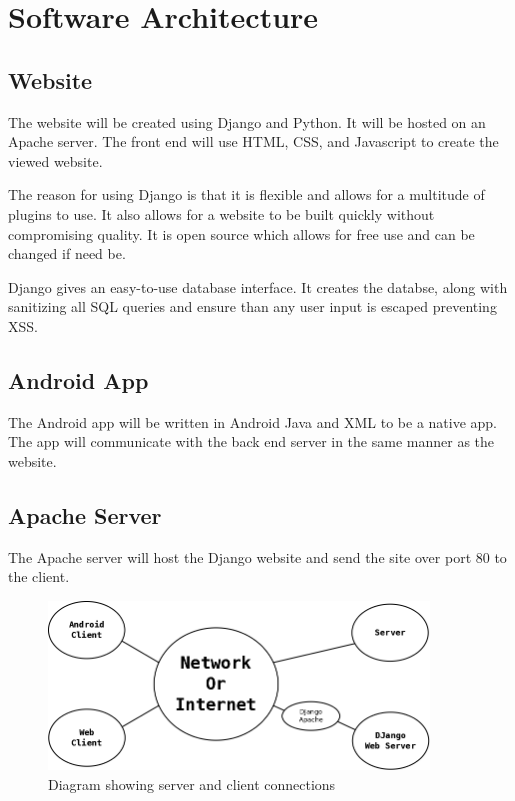 {
    \renewcommand*{\theenumi}{\thesubsection.\arabic{enumi}}
    \renewcommand*{\theenumii}{\theenumi.\arabic{enumii}}
    \renewcommand*{\theenumiii}{\theenumii.\arabic{enumiii}}

    \section{Software Architecture}

    \subsection{Website}

        The website will be created using Django and Python. It will be hosted 
        on an Apache server. The front end will use HTML, CSS, and Javascript
        to create the viewed website.

        The reason for using Django is that it is flexible and allows for 
        a multitude of plugins to use. It also allows for a website to be built
        quickly without compromising quality. It is open source which allows
        for free use and can be changed if need be.

        Django gives an easy-to-use database interface. It creates the databse,
        along with sanitizing all SQL queries and ensure than any user input
        is escaped preventing XSS. 

    \subsection{Android App}
        
        The Android app will be written in Android Java and XML to be a native
        app. The app will communicate with the back end server in the same 
        manner as the website. 

    \subsection{Apache Server}

        The Apache server will host the Django website and send the site over
        port 80 to the client.

        \begin{figure}[htb]
            \centering
            \includegraphics[width=0.9\textwidth]{Images/Web.png}
            \caption{Diagram showing server and client connections}
            \label{fig:NetworkDiagram}
        \end{figure}
    
}
